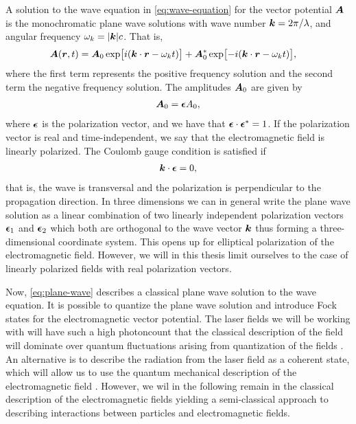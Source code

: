         A solution to the wave equation in \autoref{eq:wave-equation} for the
        vector potential $\boldsymbol{A}$ is the monochromatic plane wave solutions
        with wave number $\boldsymbol{k} = 2\pi / \lambda$, and angular frequency
        $\omega_k = \abs{\boldsymbol{k}} c$.
        That is,
        \begin{align}
            \boldsymbol{A}(\boldsymbol{r}, t)
            &= \boldsymbol{A}_0 \exp[i(\boldsymbol{k}\cdot \boldsymbol{r} - \omega_k t)]
            + \boldsymbol{A}^{*}_0 \exp[-i(\boldsymbol{k}\cdot\boldsymbol{r} - \omega_k t)],
            \label{eq:plane-wave}
        \end{align}
        where the first term represents the positive frequency solution and the
        second term the negative frequency solution.
        The amplitudes $\boldsymbol{A}_0$ are given by
        \begin{align}
            \boldsymbol{A}_0 = \boldsymbol{\epsilon} A_0,
        \end{align}
        where $\boldsymbol{\epsilon}$ is the polarization vector, and we have that
        $\boldsymbol{\epsilon}\cdot\boldsymbol{\epsilon}^{*} = 1$.
        If the polarization vector is real and time-independent, we say that the
        electromagnetic field is linearly polarized.
        The Coulomb gauge condition is satisfied if
        \begin{align}
            \boldsymbol{k}\cdot \boldsymbol{\epsilon} = 0,
        \end{align}
        that is, the wave is transversal and the polarization is perpendicular
        to the propagation direction.
        In three dimensions we can in general write the plane wave solution as a
        linear combination of two linearly independent polarization vectors
        $\boldsymbol{\epsilon}_1$ and $\boldsymbol{\epsilon}_2$ which both are orthogonal to
        the wave vector $\boldsymbol{k}$ thus forming a three-dimensional coordinate
        system.
        This opens up for elliptical polarization of the electromagnetic field.
        However, we will in this thesis limit ourselves to the case of linearly
        polarized fields with real polarization vectors.

        Now, \autoref{eq:plane-wave} describes a classical plane wave solution
        to the wave equation.
        It is possible to quantize the plane wave solution and introduce Fock
        states for the electromagnetic vector potential.
        The laser fields we will be working with will have such a high
        photoncount that the classical description of the field will dominate
        over quantum fluctuations arising from quantization of the fields
        \cite{joachain2012atoms}.
        An alternative is to describe the radiation from the laser field as a
        coherent state, which will allow us to use the quantum mechanical
        description of the electromagnetic field \cite{joachain2012atoms,
        modern-qm}.
        However, we wil in the following remain in the classical description of
        the electromagnetic fields yielding a semi-classical approach to
        describing interactions between particles and electromagnetic fields.

